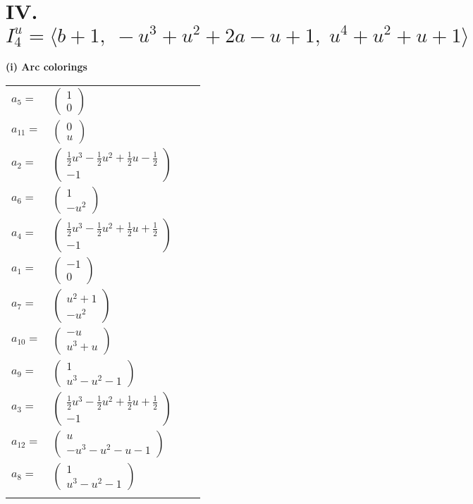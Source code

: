 \documentclass[1p]{elsarticle_modified}
\theoremstyle{definition}
\begin{document}
\centering \section*{IV. $I^u_{4}= \langle b+1,\;- u^3+u^2+2 a- u+1,\;u^4+u^2+u+1 \rangle$}
\flushleft \textbf{(i) Arc colorings}\\
\begin{tabular}{m{7pt} m{180pt} m{7pt} m{180pt} }
\flushright $a_{5}=$&$\begin{pmatrix}1\\0\end{pmatrix}$ \\
\flushright $a_{11}=$&$\begin{pmatrix}0\\u\end{pmatrix}$ \\
\flushright $a_{2}=$&$\begin{pmatrix}\frac{1}{2} u^3-\frac{1}{2} u^2+\frac{1}{2} u-\frac{1}{2}\\-1\end{pmatrix}$ \\
\flushright $a_{6}=$&$\begin{pmatrix}1\\- u^2\end{pmatrix}$ \\
\flushright $a_{4}=$&$\begin{pmatrix}\frac{1}{2} u^3-\frac{1}{2} u^2+\frac{1}{2} u+\frac{1}{2}\\-1\end{pmatrix}$ \\
\flushright $a_{1}=$&$\begin{pmatrix}-1\\0\end{pmatrix}$ \\
\flushright $a_{7}=$&$\begin{pmatrix}u^2+1\\- u^2\end{pmatrix}$ \\
\flushright $a_{10}=$&$\begin{pmatrix}- u\\u^3+u\end{pmatrix}$ \\
\flushright $a_{9}=$&$\begin{pmatrix}1\\u^3- u^2-1\end{pmatrix}$ \\
\flushright $a_{3}=$&$\begin{pmatrix}\frac{1}{2} u^3-\frac{1}{2} u^2+\frac{1}{2} u+\frac{1}{2}\\-1\end{pmatrix}$ \\
\flushright $a_{12}=$&$\begin{pmatrix}u\\- u^3- u^2- u-1\end{pmatrix}$ \\
\flushright $a_{8}=$&$\begin{pmatrix}1\\u^3- u^2-1\end{pmatrix}$\\&\end{tabular}
\end{document}
